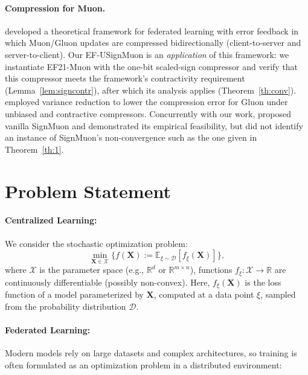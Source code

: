 \documentclass{article}
\begin{document}
\paragraph{Compression for Muon.} \citet{gruntkowska2025error} developed a theoretical framework for federated learning with error feedback in which Muon/Gluon \citep{riabinin2025gluon} updates are compressed bidirectionally (client-to-server and server-to-client). Our EF-USignMuon is an \emph{application} of this framework: we instantiate EF21-Muon with the one-bit scaled-sign compressor and verify that this compressor meets the framework's contractivity requirement (Lemma~\ref{lem:signcontr}), after which its analysis applies (Theorem~\ref{th:conv}). \citet{qian2026communicationefficientgluon} employed variance reduction to lower the compression error for Gluon under unbiased and contractive compressors. Concurrently with our work, \citet{mishra2026signmuon} proposed vanilla SignMuon and demonstrated its empirical feasibility, but did not identify an instance of SignMuon's non-convergence such as the one given in Theorem~\ref{th:1}.

\section{Problem Statement}\label{sec:proState}

\paragraph{Centralized Learning:} We consider the stochastic optimization problem:
\begin{equation}
\min_{\mathbf{X} \in \mathcal{X}} \{f(\mathbf{X}) := \mathbb{E}_{\xi \sim \mathcal{D}} [f_{\xi}(\mathbf{X})]\},
\end{equation}
where $\mathcal{X}$ is the parameter space (e.g., $\mathbb{R}^d$ or $\mathbb{R}^{m \times n}$), functions $f_{\xi} : \mathcal{X} \to \mathbb{R}$ are continuously differentiable (possibly non-convex). Here, $f_{\xi}(\mathbf{X})$ is the loss function of a model parameterized by $\mathbf{X}$, computed at a data point $\xi$, sampled from the probability distribution $\mathcal{D}$.

\paragraph{Federated Learning:} 
Modern models rely on large datasets and complex architectures, so training is often formulated as an optimization problem in a distributed environment:
\end{document}
